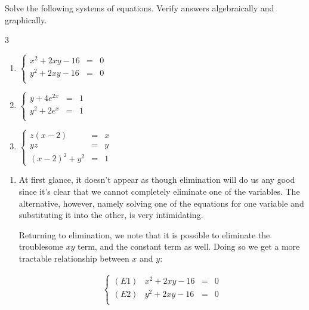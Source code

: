 \documentclass{ximera}
\begin{document}
\begin{example}  \label{nonlinearex2} Solve the following systems of equations.  Verify answers algebraically and graphically.

\begin{multicols}{3}

\begin{enumerate}

\item  $\left\{\begin{array}{rcl}  x^2 +2xy -16 & = & 0 \\ y^2 +2xy -16 & = & 0 \\ \end{array} \right.$

\item  $\left\{\begin{array}{rcl}  y+4e^{2x} & = & 1 \\y^2 + 2e^{x} & = & 1 \\ \end{array} \right.$

\item  $\left\{\begin{array}{rcl}   z(x-2) & = & x \\ yz & = & y \\ (x-2)^2+y^2 & = & 1 \end{array} \right.$


\end{enumerate}

\end{multicols}

\begin{explanation}

\begin{enumerate}

\item  At first glance, it doesn't appear as though elimination will do us any good since it's clear that we cannot  completely eliminate one of the variables.  The alternative, however, namely solving one of the equations for one variable and substituting it into the other, is very intimidating.

Returning to elimination,  we note that it is possible to eliminate the troublesome $xy$ term, and the constant term as well. Doing so we get a more tractable relationship between $x$ and $y$:

\[ \begin{array}{ccc}

\left\{\begin{array}{lrcr} (E1) & x^2 +2xy -16 & = & 0 \\ (E2) & y^2 +2xy -16 & = & 0 \\ \end{array} \right.


\end{array}\]
\end{enumerate}
\end{explanation}
\end{example}
\end{document}
